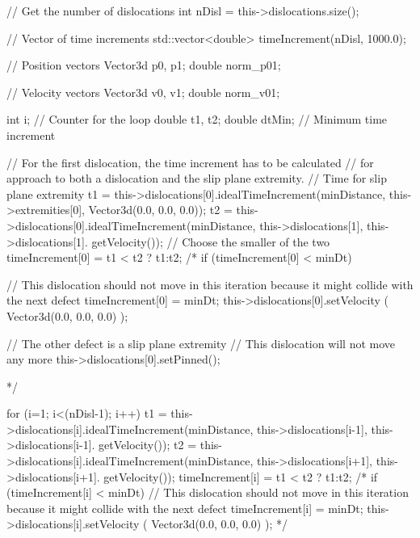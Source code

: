 \begin{DoxyCode}
{
  // Get the number of dislocations
  int nDisl = this->dislocations.size();

  // Vector of time increments
  std::vector<double> timeIncrement(nDisl, 1000.0);

  // Position vectors
  Vector3d p0, p1;
  double norm_p01;

  // Velocity vectors
  Vector3d v0, v1;
  double norm_v01;

  int i;         // Counter for the loop
  double t1, t2;
  double dtMin;  // Minimum time increment

  // For the first dislocation, the time increment has to be calculated
  // for approach to both a dislocation and the slip plane extremity.
  // Time for slip plane extremity
  t1 = this->dislocations[0].idealTimeIncrement(minDistance,
                                                this->extremities[0],
                                                Vector3d(0.0, 0.0, 0.0));
  t2 = this->dislocations[0].idealTimeIncrement(minDistance,
                                                this->dislocations[1],
                                                this->dislocations[1].
      getVelocity());
  // Choose the smaller of the two
  timeIncrement[0] = t1 < t2 ? t1:t2;
  /*
    if (timeIncrement[0] < minDt)
    {
    // This dislocation should not move in this iteration because it might
       collide with the next defect
    timeIncrement[0] = minDt;
    this->dislocations[0].setVelocity ( Vector3d(0.0, 0.0, 0.0) );

    // The other defect is a slip plane extremity
    // This dislocation will not move any more
    this->dislocations[0].setPinned();
    }
  */

  for (i=1; i<(nDisl-1); i++)
    {
      t1 = this->dislocations[i].idealTimeIncrement(minDistance,
                                                    this->dislocations[i-1],
                                                    this->dislocations[i-1].
      getVelocity());
      t2 = this->dislocations[i].idealTimeIncrement(minDistance,
                                                    this->dislocations[i+1],
                                                    this->dislocations[i+1].
      getVelocity());
      timeIncrement[i] = t1 < t2 ? t1:t2;
      /*
        if (timeIncrement[i] < minDt)
        {
        // This dislocation should not move in this iteration because it might
       collide with the next defect
        timeIncrement[i] = minDt;
        this->dislocations[i].setVelocity ( Vector3d(0.0, 0.0, 0.0) );
        }
      */
    }

}
\end{DoxyCode}
